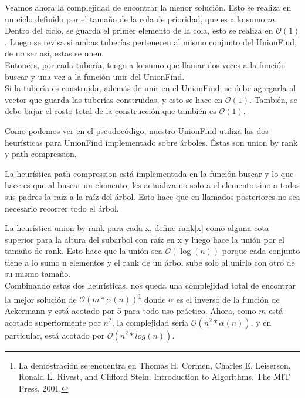 Veamos ahora la complejidad de encontrar la menor solución. Esto se realiza en un ciclo definido por el tamaño de la cola de prioridad, que es a lo sumo $m$. Dentro del ciclo, se guarda el primer elemento de la cola, esto se realiza en $\mathcal{O}(1)$. Luego se revisa si ambas tuberías pertenecen al mismo conjunto del UnionFind, de no ser así, estas se unen. \\

Entonces, por cada tubería, tengo a lo sumo que llamar dos veces a la función buscar y una vez a la función unir del UnionFind. \\

Si la tubería es construida, además de unir en el UnionFind, se debe agregarla al vector que guarda las tuberías construidas, y esto se hace en $\mathcal{O}(1)$. También, se debe bajar el costo total de la construcción que también es $\mathcal{O}(1)$.

Como podemos ver en el pseudocódigo, nuestro UnionFind utiliza las dos heurísticas para UnionFind implementado sobre árboles. Éstas son union by rank y path compression.

La heurística path compression está implementada en la función buscar y lo que hace es que al buscar un elemento, les actualiza no solo a el elemento sino a todos sus padres la raíz a la raíz del árbol. Esto hace que en llamados posteriores no sea necesario recorrer todo el árbol.

La heurística union by rank para cada x, define rank[x] como alguna
cota superior para la altura del subarbol con raíz en x y luego hace la unión por el tamaño de rank. Esto hace que la unión sea $\mathcal{O}(\log(n))$ porque cada conjunto tiene a lo sumo n elementos y el rank de un árbol sube solo al unirlo con otro de su mismo tamaño. \\

Combinando estas dos heurísticas, nos queda una complejidad total de encontrar la mejor solución de $\mathcal{O}(m*\alpha(n))$\footnote{La demostración se encuentra en Thomas H. Cormen, Charles E. Leiserson, Ronald L. Rivest, and Clifford Stein. Introduction to Algorithms.
The MIT Press, 2001.}
donde $\alpha$ es el inverso de la función de Ackermann y está acotado por 5 para todo uso práctico. Ahora, como $m$ está acotado superiormente por $n^2$, la complejidad sería $\mathcal{O}(n^2*\alpha(n))$, y en particular, está acotado por $\mathcal{O}(n^2*log(n))$.\\


